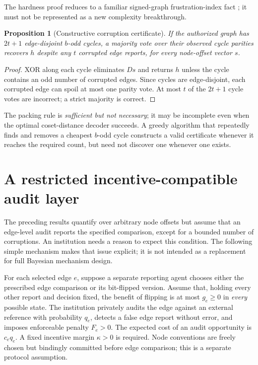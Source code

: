 \documentclass[10pt,a4paper]{article}
\newtheorem{proposition}[theorem]{Proposition}
\theoremstyle{definition}\newtheorem{definition}[theorem]{Definition}
\begin{document}
The hardness proof reduces to a familiar signed-graph frustration-index fact \cite{aref2019}; it must not be represented as a new complexity breakthrough.

\begin{proposition}[Constructive corruption certificate]
If the authorized graph has $2t+1$ \emph{edge-disjoint} $b$-odd cycles, a majority vote over their observed cycle parities recovers $h$ despite any $t$ corrupted edge reports, for every node-offset vector $s$.
\end{proposition}
\begin{proof}
XOR along each cycle eliminates $Ds$ and returns $h$ unless the cycle contains an odd number of corrupted edges. Since cycles are edge-disjoint, each corrupted edge can spoil at most one parity vote. At most $t$ of the $2t+1$ cycle votes are incorrect; a strict majority is correct.
\end{proof}

The packing rule is \emph{sufficient but not necessary}; it may be incomplete even when the optimal coset-distance decoder succeeds. A greedy algorithm that repeatedly finds and removes a cheapest $b$-odd cycle constructs a valid certificate whenever it reaches the required count, but need not discover one whenever one exists.

\section{A restricted incentive-compatible audit layer}
The preceding results quantify over arbitrary node offsets but assume that an edge-level audit reports the specified comparison, except for a bounded number of corruptions. An institution needs a reason to expect this condition. The following simple mechanism makes that issue explicit; it is not intended as a replacement for full Bayesian mechanism design.

For each selected edge $e$, suppose a separate reporting agent chooses either the prescribed edge comparison or its bit-flipped version. Assume that, holding every other report and decision fixed, the benefit of flipping is at most $g_e\ge0$ in \emph{every} possible state. The institution privately audits the edge against an external reference with probability $q_e$, detects a false edge report without error, and imposes enforceable penalty $F_e>0$. The expected cost of an audit opportunity is $c_eq_e$. A fixed incentive margin $\kappa>0$ is required. Node conventions are freely chosen but bindingly committed before edge comparison; this is a separate protocol assumption.
\end{document}
